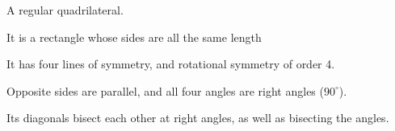 A regular quadrilateral.
\par
It is a  rectangle whose sides are all the same length
\par
It has four lines of symmetry, and rotational symmetry of order 4.  
\par
Opposite sides are parallel, and all four angles are right angles ($90^{\circ}$).  
\par
Its diagonals bisect each other at right angles, as well as bisecting the angles.